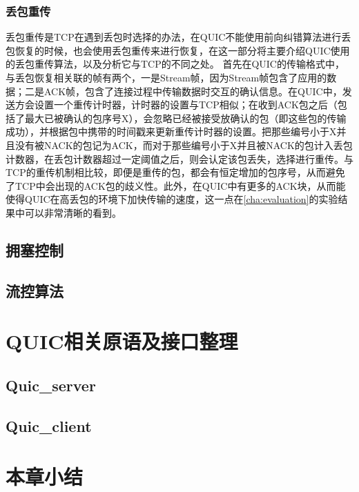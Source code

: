 \subsubsection{丢包重传}
丢包重传是TCP在遇到丢包时选择的办法，在QUIC不能使用前向纠错算法进行丢包恢复的时候，也会使用丢包重传来进行恢复，在这一部分将主要介绍QUIC使用的丢包重传算法，以及分析它与TCP的不同之处。
首先在QUIC的传输格式中，与丢包恢复相关联的帧有两个，一是Stream帧，因为Stream帧包含了应用的数据；二是ACK帧，包含了连接过程中传输数据时交互的确认信息。在QUIC中，发送方会设置一个重传计时器，计时器的设置与TCP相似；在收到ACK包之后（包括了最大已被确认的包序号X），会忽略已经被接受放确认的包（即这些包的传输成功），并根据包中携带的时间戳来更新重传计时器的设置。把那些编号小于X并且没有被NACK的包记为ACK，而对于那些编号小于X并且被NACK的包计入丢包计数器，在丢包计数器超过一定阈值之后，则会认定该包丢失，选择进行重传。与TCP的重传机制相比较，即便是重传的包，都会有恒定增加的包序号，从而避免了TCP中会出现的ACK包的歧义性。此外，在QUIC中有更多的ACK块，从而能使得QUIC在高丢包的环境下加快传输的速度，这一点在\ref{cha:evaluation}的实验结果中可以非常清晰的看到。
\subsection{拥塞控制}

\subsection{流控算法}

\section{QUIC相关原语及接口整理}
\subsection{Quic\_server}
\subsection{Quic\_client}
\section{本章小结}
